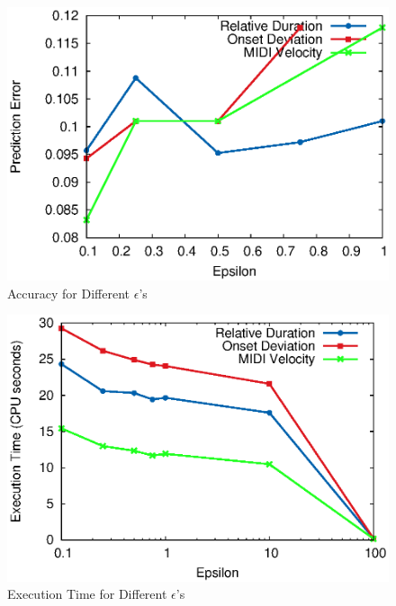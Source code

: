 \begin{figure}[tp]
   \begin{center}
      \includegraphics[width=\textwidth]{fig/eps_accu.eps}

   \end{center}
   \caption{Accuracy for Different $\epsilon$'s}
   \label{fig:eps_accu}
\end{figure}
\begin{figure}[tp]
   \begin{center}
      \includegraphics[width=\textwidth]{fig/eps_time.eps}

   \end{center}
   \caption{Execution Time for Different $\epsilon$'s}
   \label{fig:eps_time}
\end{figure}

